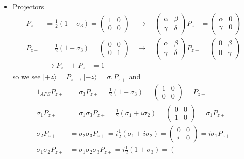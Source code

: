\documentclass[../main.tex]{subfiles}
\begin{document}
\begin{itemize}
\begin{itemize}
\item Projectors
\begin{align}
P_{z+}
&=\frac{1}{2}(1+\sigma_3)
=\left(\begin{matrix}
1 & 0 \\
0 & 0 
\end{matrix}
\right)\quad\rightarrow\quad
\left(\begin{matrix}
\alpha & \beta \\
\gamma & \delta 
\end{matrix}
\right)P_{z+}=\left(\begin{matrix}
\alpha & 0 \\
\gamma & 0 
\end{matrix}
\right)\\
P_{z-}
&=\frac{1}{2}(1-\sigma_3)
=\left(\begin{matrix}
0 & 0 \\
0 & 1 
\end{matrix}
\right)\quad\rightarrow\quad
\left(\begin{matrix}
\alpha & \beta \\
\gamma & \delta 
\end{matrix}
\right)P_{z-}=\left(\begin{matrix}
0 & \beta \\
0 & \gamma 
\end{matrix}
\right)\\
&\rightarrow P_{z+}+P_{z-}=1
\end{align}
so we see $|+z\rangle=P_{z+}$, $|-z\rangle=\sigma_1P_{z+}$ 
and
\begin{align}
1_{APS}P_{z+}&=\sigma_3P_{z+}=\frac{1}{2}(1+\sigma_3)=\left(\begin{matrix}
1 & 0 \\
0 & 0 
\end{matrix}
\right)=P_{z+}\\
\sigma_1P_{z+}&=\sigma_1\sigma_3P_{z+}=\frac{1}{2}(\sigma_1+i\sigma_2)=\left(\begin{matrix}
0 & 0 \\
1 & 0 
\end{matrix}
\right)=\sigma_1P_{z+}\\
\sigma_2P_{z+}&=\sigma_2\sigma_3P_{z+}=i\frac{1}{2}(\sigma_1+i\sigma_2)=\left(\begin{matrix}
0 & 0 \\
i & 0 
\end{matrix}
\right)=i\sigma_1P_{z+}\\
\sigma_1\sigma_2P_{z+}&=\sigma_1\sigma_2\sigma_3P_{z+}=i\frac{1}{2}(1+\sigma_3)=\left(\begin{matrix}

\end{matrix}
\end{align}
\end{itemize}
\end{itemize}
\end{document}

